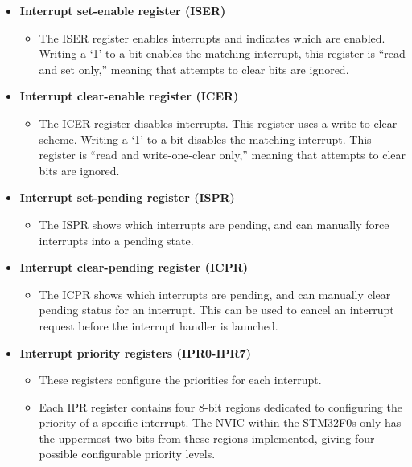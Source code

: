 \documentclass[11pt,fleqn]{book} %
\begin{document}
\begin{itemize}
    \item \textbf{Interrupt set-enable register (ISER)}
        \begin{itemize}
            \item The ISER register enables interrupts and indicates which are enabled.
            Writing a `1' to a bit enables the matching interrupt, this register is ``read and set only,'' meaning that attempts to clear bits are ignored. 
        \end{itemize}
    \item \textbf{Interrupt clear-enable register (ICER)}
        \begin{itemize}
            \item The ICER register disables interrupts.
            This register uses a write to clear scheme. Writing a `1' to a bit disables the matching interrupt. This register is ``read and write-one-clear only,'' meaning that attempts to clear bits are ignored. 
        \end{itemize}
    \item \textbf{Interrupt set-pending register (ISPR)}
        \begin{itemize}
            \item The ISPR shows which interrupts are pending, and can manually force interrupts into a pending state. 
        \end{itemize}
    \item \textbf{Interrupt clear-pending register (ICPR)}
        \begin{itemize}
            \item The ICPR shows which interrupts are pending, and can manually clear pending status for an interrupt. This can be used to cancel an interrupt request before the interrupt handler is launched.
        \end{itemize}
    \item \textbf{Interrupt priority registers (IPR0-IPR7)}
        \begin{itemize}
            \item These registers configure the priorities for each interrupt. 
            \item Each IPR register contains four 8-bit regions dedicated to configuring the priority of a specific interrupt. The NVIC within the STM32F0s only has the uppermost two bits from these regions implemented, giving four possible configurable priority levels.            
        \end{itemize}
\end{itemize}
\end{document}

